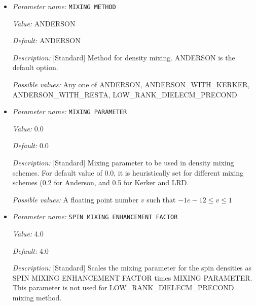 \begin{itemize}
{\it Default:} 10


{\it Description:} [Standard] Number of SCF iteration history to be considered for density mixing schemes. For metallic systems, a mixing history larger than the default value provides better scf convergence.


{\it Possible values:} An integer $n$ such that $1\leq n \leq 1000$
\item {\it Parameter name:} {\tt MIXING METHOD}
\label{parameters:SCF parameters/MIXING METHOD}
\label{parameters:SCF_20parameters/MIXING_20METHOD}


{\it Value:} ANDERSON


{\it Default:} ANDERSON


{\it Description:} [Standard] Method for density mixing. ANDERSON is the default option.


{\it Possible values:} Any one of ANDERSON, ANDERSON\_WITH\_KERKER, ANDERSON\_WITH\_RESTA, LOW\_RANK\_DIELECM\_PRECOND
\item {\it Parameter name:} {\tt MIXING PARAMETER}
\label{parameters:SCF parameters/MIXING PARAMETER}
\label{parameters:SCF_20parameters/MIXING_20PARAMETER}


{\it Value:} 0.0


{\it Default:} 0.0


{\it Description:} [Standard] Mixing parameter to be used in density mixing schemes. For default value of 0.0, it is heuristically set for different mixing schemes (0.2 for Anderson, and 0.5 for Kerker and LRD.


{\it Possible values:} A floating point number $v$ such that $-1e-12 \leq v \leq 1$
\item {\it Parameter name:} {\tt SPIN MIXING ENHANCEMENT FACTOR}
\label{parameters:SCF parameters/SPIN MIXING ENHANCEMENT FACTOR}
\label{parameters:SCF_20parameters/SPIN_20MIXING_20ENHANCEMENT_20FACTOR}


{\it Value:} 4.0


{\it Default:} 4.0


{\it Description:} [Standard] Scales the mixing parameter for the spin densities as SPIN MIXING ENHANCEMENT FACTOR times MIXING PARAMETER. This parameter is not used for LOW\_RANK\_DIELECM\_PRECOND mixing method.



\end{itemize}
